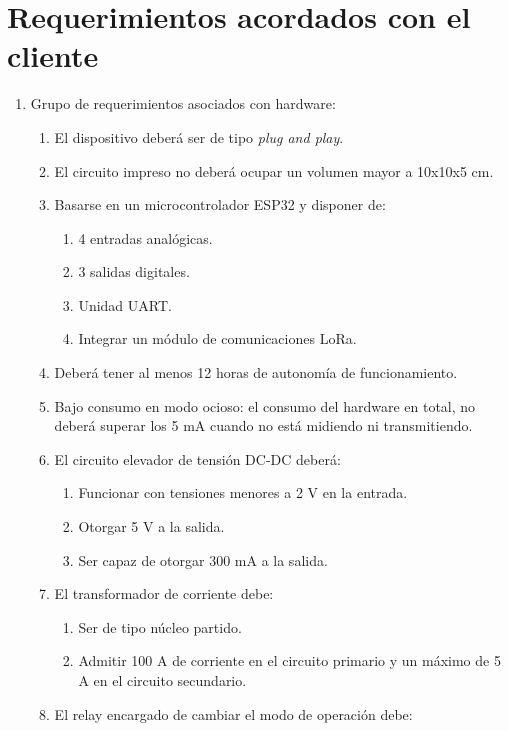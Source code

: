 \section{Requerimientos acordados con el cliente}
\label{sec:requerimientos}
\begin{enumerate}
	\item Grupo de requerimientos asociados con hardware:
	\begin{enumerate}
		\item El dispositivo deberá ser de tipo \textit{plug and play}.
		\item El circuito impreso no deberá ocupar un volumen mayor a 10x10x5 cm.
		\item Basarse en un microcontrolador ESP32 y disponer de:
		\begin{enumerate}%
			\item 4 entradas analógicas.
			\item 3 salidas digitales.
			\item Unidad UART.
			\item Integrar un módulo de comunicaciones LoRa.
		\end{enumerate}
		\item Deberá tener al menos 12 horas de autonomía de funcionamiento.\label{req_autonomia}
		\item Bajo consumo en modo ocioso: el consumo del hardware en total, no deberá superar los 5 mA cuando no está midiendo ni transmitiendo.\label{req_deep_sleep}
		\item El circuito elevador de tensión DC-DC deberá:
		\begin{enumerate}%
			\item Funcionar con tensiones menores a 2 V en la entrada.
			\item Otorgar 5 V a la salida.
			\item Ser capaz de otorgar 300 mA a la salida.
		\end{enumerate}
		\item El transformador de corriente debe:\label{requerimientos_corriente_ti}
		\begin{enumerate}%
			\item Ser de tipo núcleo partido.
			\item Admitir 100 A de corriente en el circuito primario y un máximo de 5 A en el circuito secundario.
		\end{enumerate}
		\item \label{req_relay} El relay encargado de cambiar el modo de operación debe:

\end{enumerate}
\end{enumerate}
